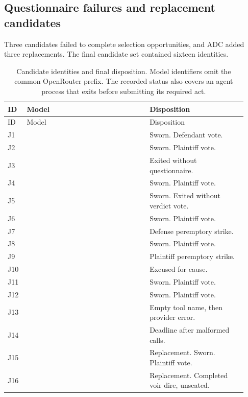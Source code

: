 \subsection{Questionnaire failures and replacement candidates}

Three candidates failed to complete selection opportunities, and ADC added three replacements.  The final candidate set contained sixteen identities.

\begin{longtable}{@{}L{0.07\linewidth}L{0.48\linewidth}L{0.38\linewidth}@{}}
\caption{Candidate identities and final disposition.  Model identifiers omit the common OpenRouter prefix.  The recorded status  also covers an agent process that exits before submitting its required act.}\label{tab:panel}\\
\toprule
ID & Model & Disposition\\
\midrule
\endfirsthead
\toprule ID & Model & Disposition\\ \midrule
\endhead
J1 &  & Sworn.  Defendant vote.\\
J2 &  & Sworn.  Plaintiff vote.\\
J3 &  & Exited without questionnaire.\\
J4 &  & Sworn.  Plaintiff vote.\\
J5 &  & Sworn.  Exited without verdict vote.\\
J6 &  & Sworn.  Plaintiff vote.\\
J7 &  & Defense peremptory strike.\\
J8 &  & Sworn.  Plaintiff vote.\\
J9 &  & Plaintiff peremptory strike.\\
J10 &  & Excused for cause.\\
J11 &  & Sworn.  Plaintiff vote.\\
J12 &  & Sworn.  Plaintiff vote.\\
J13 &  & Empty tool name, then provider error.\\
J14 &  & Deadline after malformed calls.\\
J15 &  & Replacement.  Sworn.  Plaintiff vote.\\
J16 &  & Replacement.  Completed voir dire, unseated.\\
\bottomrule
\end{longtable}

